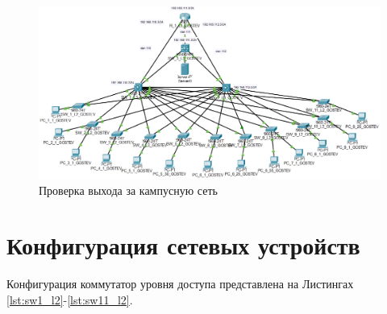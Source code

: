 \documentclass[14pt, a4paper]{extarticle}
\numberwithin{equation}{section}
\begin{document}
\begin{landscape}
\begin{figure}[H]
        \centering
        \includegraphics[scale=0.7]{pt_topo.png}
        \caption{Проверка выхода за кампусную сеть}
        \label{fig:pt_topo}
\end{figure}
\end{landscape}

\section{Конфигурация сетевых устройств}
Конфигурация коммутатор уровня доступа представлена на Листингах \ref{lst:sw1_l2}-\ref{lst:sw11_l2}.


\newpage

\newpage


\newpage

\newpage


\newpage

\newpage


\newpage

\newpage
\end{document}
